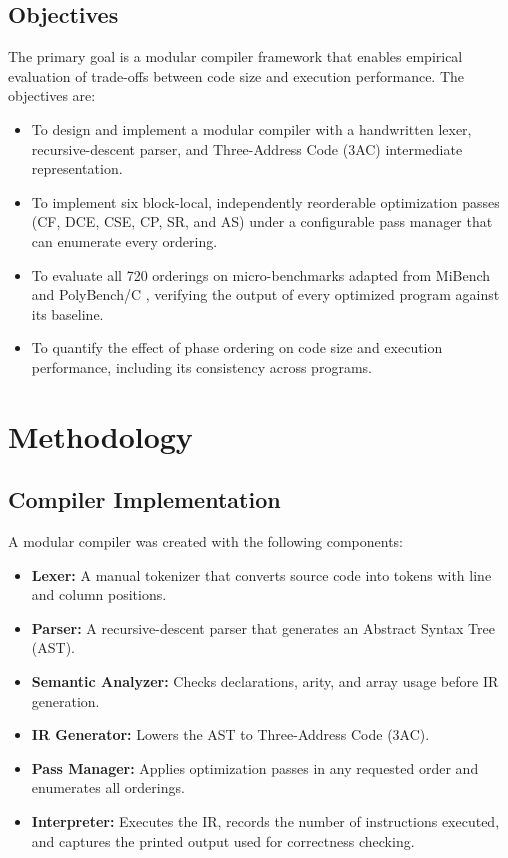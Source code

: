 \documentclass[conference]{IEEEtran}
\begin{document}
\subsection{Objectives}
The primary goal is a modular compiler framework that enables empirical evaluation of trade-offs between code size and execution performance. The objectives are:
\begin{itemize}
    \item To design and implement a modular compiler with a handwritten lexer, recursive-descent parser, and Three-Address Code (3AC) intermediate representation.
    \item To implement six block-local, independently reorderable optimization passes (CF, DCE, CSE, CP, SR, and AS) under a configurable pass manager that can enumerate every ordering.
    \item To evaluate all 720 orderings on micro-benchmarks adapted from MiBench \cite{ref32} and PolyBench/C \cite{ref31}, verifying the output of every optimized program against its baseline.
    \item To quantify the effect of phase ordering on code size and execution performance, including its consistency across programs.
\end{itemize}

\section{Methodology}

\subsection{Compiler Implementation}

A modular compiler was created with the following components:

\begin{itemize}
    \item \textbf{Lexer:} A manual tokenizer that converts source code into tokens with line and column positions.
    \item \textbf{Parser:} A recursive-descent parser that generates an Abstract Syntax Tree (AST).
    \item \textbf{Semantic Analyzer:} Checks declarations, arity, and array usage before IR generation.
    \item \textbf{IR Generator:} Lowers the AST to Three-Address Code (3AC).
    \item \textbf{Pass Manager:} Applies optimization passes in any requested order and enumerates all orderings.
    \item \textbf{Interpreter:} Executes the IR, records the number of instructions executed, and captures the printed output used for correctness checking.
\end{itemize}
\end{document}
